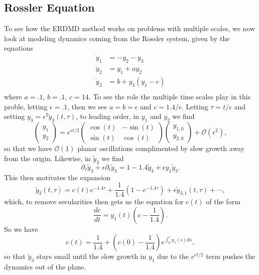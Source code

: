 \documentclass[a4paper,11pt]{article}
\newcommand{\p}{\partial}
\begin{document}
\subsection*{Rossler Equation}
To see how the ERDMD method works on problems with multiple scales, we now look at modeling dynamics coming from the Rossler system, given by the equations
\begin{align*}
\dot{y}_{1} & = -y_{2} - y_{3}\\
\dot{y}_{2} & = y_{1} + ay_{2}\\
\dot{y}_{3} & = b + y_{3}(y_{1}-c)\\
\end{align*} 
where $a=.1$, $b=.1$, $c=14$.  To see the role the multiple time scales play in this proble, letting $\epsilon=.1$, then we see $a=b=\epsilon$ and $c=1.4/\epsilon$.  Letting $\tau = t/\epsilon$ and setting $y_{3} = \epsilon^{2}\tilde{y}_{3}(t,\tau)$, to leading order, in $y_{1}$ and $y_{2}$ we find 
\[
\begin{pmatrix}y_{1} \\ y_{2}\end{pmatrix} = e^{\epsilon t/2}\begin{pmatrix}\cos(t) & -\sin(t) \\ \sin(t) & \cos(t)\end{pmatrix}\begin{pmatrix}y_{1,0} \\ y_{2,0}\end{pmatrix} + \mathcal{O}(\epsilon^{2}),
\]
so that we have $\mathcal{O}(1)$ planar oscillations complimented by slow growth away from the origin.  Likewise, in $\tilde{y}_{3}$ we find 
\[
\p_{\tau}\tilde{y}_{3} + \epsilon \p_{t}\tilde{y}_{3} = 1 - 1.4\tilde{y}_{3} + \epsilon y_{1}\tilde{y}_{3}.
\]
This then motivates the expansion 
\[
\tilde{y}_{3}(t,\tau) = c(t) e^{-1.4\tau} + \frac{1}{1.4}\left(1-e^{-1.4\tau} \right) + \epsilon \tilde{y}_{3,1}(t,\tau) + \cdots, 
\]
which, to remove secularities then gets us the equation for $c(t)$ of the form
\[
\frac{dc}{dt} = y_{1}(t)\left(c - \frac{1}{1.4} \right).
\]
So we have 
\[
c(t) = \frac{1}{1.4} + \left(c(0)-\frac{1}{1.4}\right)e^{\int_{0}^{t}y_{1}(s)ds},
\]
so that $\tilde{y}_{3}$ stays small until the slow growth in $y_{1}$ due to the $e^{\epsilon t/2}$ term pushes the dynamics out of the plane.  
\end{document}
